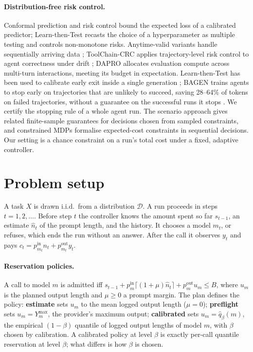 \documentclass[11pt]{article}
\theoremstyle{remark}
\begin{document}
\paragraph{Distribution-free risk control.}
Conformal prediction and risk control \citep{bates2021rcps,angelopoulos2022crc}
bound the expected loss of a calibrated predictor; Learn-then-Test
\citep{angelopoulos2021ltt} recasts the choice of a hyperparameter as multiple
testing and controls non-monotone risks. Anytime-valid variants handle
sequentially arriving data \citep{hultberg2026anytime}; ToolChain-CRC applies
trajectory-level risk control to agent correctness under drift
\citep{opoku2026toolchaincrc}; DAPRO \citep{feldman2026spend} allocates
evaluation compute across multi-turn interactions, meeting its budget in
expectation. Learn-then-Test has been used to calibrate early exit inside a single
generation \citep{schuster2022calm}; BAGEN trains agents to stop early on
trajectories that are unlikely to succeed, saving 28--64\% of tokens on failed
trajectories, without a guarantee on the successful runs it stops
\citep{lin2026bagen}. We certify the stopping rule of a whole agent run. The
scenario approach \citep{campi2008exact} gives related
finite-sample guarantees for decisions chosen from sampled constraints, and
constrained MDPs \citep{altman1999cmdp} formalise expected-cost constraints in
sequential decisions. Our setting is a chance constraint on a run's total cost
under a fixed, adaptive controller.

\section{Problem setup}\label{sec:setup}

A task $X$ is drawn i.i.d.\ from a distribution $\mathcal{D}$. A run proceeds in
steps $t = 1, 2, \dots$. Before step $t$ the controller knows the amount spent
so far $s_{t-1}$, an estimate $\hat n_t$ of the prompt length, and the history.
It chooses a model $m_t$, or refuses, which ends the run without an answer.
After the call it observes $y_t$ and pays $c_t = p^{\text{in}}_{m_t} n_t +
p^{\text{out}}_{m_t} y_t$.

\paragraph{Reservation policies.}
A call to model $m$ is admitted iff
$s_{t-1} + p^{\text{in}}_m \lceil (1+\mu)\hat n_t \rceil + p^{\text{out}}_m u_m \le B$,
where $u_m$ is the planned output length and $\mu \ge 0$ a prompt margin. The
plan defines the policy:
\textbf{estimate} sets $u_m$ to the mean logged output length ($\mu = 0$);
\textbf{preflight} sets $u_m = Y^{\max}_m$, the provider's maximum output;
\textbf{calibrated} sets $u_m = \hat q_\beta(m)$, the empirical $(1-\beta)$
quantile of logged output lengths of model $m$, with $\beta$ chosen by
calibration. A calibrated policy at level $\beta$ is exactly per-call quantile
reservation at level $\beta$; what differs is how $\beta$ is chosen.
\end{document}
